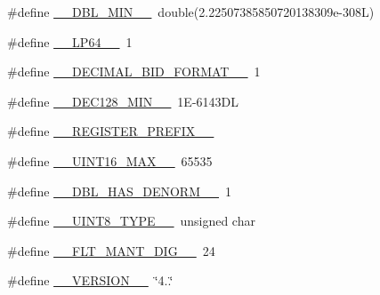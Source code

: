 \begin{DoxyCompactItemize}
\item 
\#define \hyperlink{build-analizer__host-_desktop___qt__5__9__0___g_c_c__64bit-debug_2moc__predefs_8h_a3b29a64a7b1529c08f87d256d20aade1}{\+\_\+\+\_\+\+D\+B\+L\+\_\+\+M\+I\+N\+\_\+\+\_\+}~double(2.\+22507385850720138309e-\/308\+L)
\item 
\#define \hyperlink{build-analizer__host-_desktop___qt__5__9__0___g_c_c__64bit-debug_2moc__predefs_8h_a1939a48605c72ad163215e2279590fd5}{\+\_\+\+\_\+\+L\+P64\+\_\+\+\_\+}~1
\item 
\#define \hyperlink{build-analizer__host-_desktop___qt__5__9__0___g_c_c__64bit-debug_2moc__predefs_8h_a31d221e4eef1a1f2104fe93a4236cae0}{\+\_\+\+\_\+\+D\+E\+C\+I\+M\+A\+L\+\_\+\+B\+I\+D\+\_\+\+F\+O\+R\+M\+A\+T\+\_\+\+\_\+}~1
\item 
\#define \hyperlink{build-analizer__host-_desktop___qt__5__9__0___g_c_c__64bit-debug_2moc__predefs_8h_afa4fe1921202e3770143345532136860}{\+\_\+\+\_\+\+D\+E\+C128\+\_\+\+M\+I\+N\+\_\+\+\_\+}~1\+E-\/6143\+D\+L
\item 
\#define \hyperlink{build-analizer__host-_desktop___qt__5__9__0___g_c_c__64bit-debug_2moc__predefs_8h_a08d4062230ffc8494f4be4f6447497e4}{\+\_\+\+\_\+\+R\+E\+G\+I\+S\+T\+E\+R\+\_\+\+P\+R\+E\+F\+I\+X\+\_\+\+\_\+}
\item 
\#define \hyperlink{build-analizer__host-_desktop___qt__5__9__0___g_c_c__64bit-debug_2moc__predefs_8h_a17f94731962876cdac979ae093f52605}{\+\_\+\+\_\+\+U\+I\+N\+T16\+\_\+\+M\+A\+X\+\_\+\+\_\+}~65535
\item 
\#define \hyperlink{build-analizer__host-_desktop___qt__5__9__0___g_c_c__64bit-debug_2moc__predefs_8h_ace59605d6645350a7c5cced76ffb27fa}{\+\_\+\+\_\+\+D\+B\+L\+\_\+\+H\+A\+S\+\_\+\+D\+E\+N\+O\+R\+M\+\_\+\+\_\+}~1
\item 
\#define \hyperlink{build-analizer__host-_desktop___qt__5__9__0___g_c_c__64bit-debug_2moc__predefs_8h_a0f22edb92c4da8029783c424962ac30d}{\+\_\+\+\_\+\+U\+I\+N\+T8\+\_\+\+T\+Y\+P\+E\+\_\+\+\_\+}~unsigned char
\item 
\#define \hyperlink{build-analizer__host-_desktop___qt__5__9__0___g_c_c__64bit-debug_2moc__predefs_8h_aeacc238625932b11e6cda685357dd678}{\+\_\+\+\_\+\+F\+L\+T\+\_\+\+M\+A\+N\+T\+\_\+\+D\+I\+G\+\_\+\+\_\+}~24
\item 
\#define \hyperlink{build-analizer__host-_desktop___qt__5__9__0___g_c_c__64bit-debug_2moc__predefs_8h_a5b753f1dbbed79a7126b24ca512246d5}{\+\_\+\+\_\+\+V\+E\+R\+S\+I\+O\+N\+\_\+\+\_\+}~\char`\"{}4..\char`\"{}
\item 

\end{DoxyCompactItemize}
